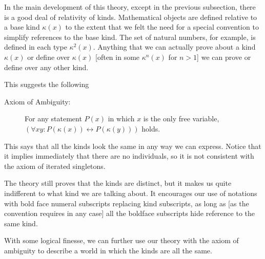 \documentclass[12pt]{article}
\begin{document}
In the main development of this theory, except in the previous subsection, there is a good deal of relativity of kinds.  Mathematical objects are defined relative to a base kind $\kappa(x)$ to the extent that we felt the need for a special convention to simplify references to the base kind.  The set of natural numbers, for example, is defined
in each type $\kappa^2(x)$.  Anything that we can actually prove about a kind $\kappa(x)$ or define over $\kappa(x)$ [often in some $\kappa^n(x)$ for $n>1$] we can prove or define over any other kind.

This suggests the following

\begin{description}

\item[Axiom of Ambiguity:]  For any statement $P(x)$ in which $x$ is the only free variable, $(\forall xy:P(\kappa(x)) \leftrightarrow P(\kappa(y)))$ holds.

\end{description}

This says that all the kinds look the same in any way we can express.  Notice that it implies immediately that there are no individuals, so it is not consistent with the axiom of iterated singletons.

The theory still proves that the kinds are distinct, but it makes us quite indifferent to what kind we are talking about.  It encourages our use of notations with bold face numeral subscripts replacing kind subscripts, as long as [as the convention requires in any case] all the boldface subscripts hide reference to the same kind.

With some logical finesse, we can further use our theory with the axiom of ambiguity to describe a world in which the kinds are all the same.
\end{document}
